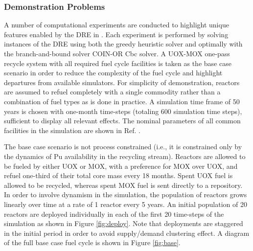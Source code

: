 
\subsubsection{Demonstration Problems}

A number of computational experiments are conducted to highlight unique
features enabled by the \gls{DRE} in \Cyclus{}. Each experiment is performed by
solving instances of the \gls{DRE} using both the greedy heuristic solver and
optimally with the branch-and-bound solver \gls{COIN-OR} Cbc solver. A
UOX-MOX one-pass recycle system with all required fuel cycle facilities is
taken as the base case scenario in order to reduce the complexity of the fuel
cycle and highlight departures from available simulators. For simplicity of
demonstration, reactors are assumed to refuel completely with a single
commodity rather than a combination of fuel types as is done in practice. A
simulation time frame of 50 years is chosen with one-month time-steps
(totaling 600 simulation time steps), sufficient to display all relevant
effects. The nominal parameters of all common facilities in the simulation are
shown in Ref. .

The base case scenario is not process constrained (i.e., it is constrained only
by the dynamics of Pu availability in the recycling stream). Reactors are
allowed to be fueled by either UOX or MOX, with a preference for MOX over UOX,
and refuel one-third of their total core mass every 18 months. Spent UOX fuel is
allowed to be recycled, whereas spent MOX fuel is sent directly to a
repository. In order to involve dynamism in the simulation, the population
of reactors grows linearly over time at a rate of 1 reactor every 5 years. An
initial population of 20 reactors are deployed individually in each of the first
20 time-steps of the simulation as shown in Figure \ref{fig:deploy}. Note that
deployments are staggered in the initial period in order to avoid supply/demand
clustering effect. A diagram of the full base case fuel cycle is shown in Figure
\ref{fig:base}.

